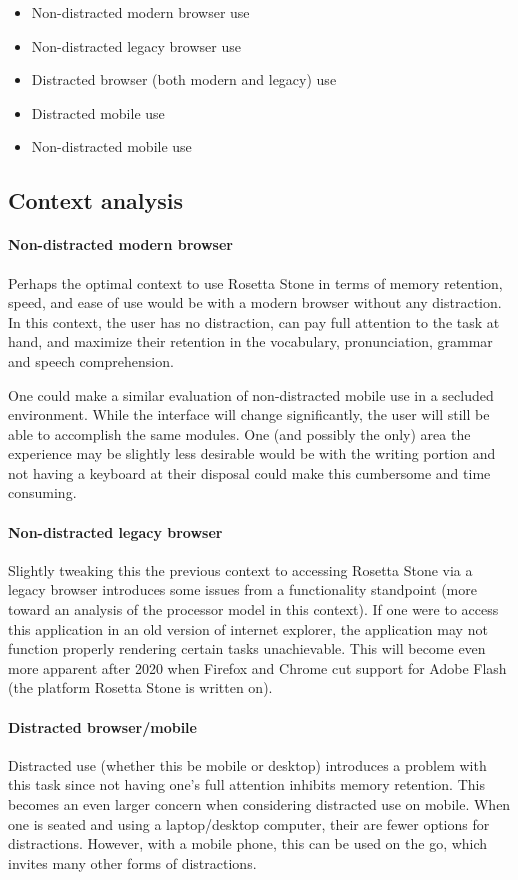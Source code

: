 \begin{itemize}
\item
  Non-distracted modern browser use
\item
  Non-distracted legacy browser use
\item
  Distracted browser (both modern and legacy) use
\item
  Distracted mobile use
\item
  Non-distracted mobile use
\end{itemize}

\subsection{Context analysis}

\paragraph{Non-distracted modern browser}
Perhaps the optimal context to use Rosetta Stone in terms of memory retention, speed, and ease of use would be with a modern browser without any distraction. In this context, the user has no distraction, can pay full attention to the task at hand, and maximize their retention in the vocabulary, pronunciation, grammar and speech comprehension.

One could make a similar evaluation of non-distracted mobile use in a secluded environment. While the interface will change significantly, the user will still be able to accomplish the same modules. One (and possibly the only) area the experience may be slightly less desirable would be with the writing portion and not having a keyboard at their disposal could make this cumbersome and time consuming.

\paragraph{Non-distracted legacy browser}
Slightly tweaking this the previous context to accessing Rosetta Stone via a legacy browser introduces some issues from a functionality standpoint (more toward an analysis of the processor model in this context). If one were to access this application in an old version of internet explorer, the application may not function properly rendering certain tasks unachievable. This will become even more apparent after 2020 when Firefox and Chrome cut support for Adobe Flash (the platform Rosetta Stone is written on).

\paragraph{Distracted browser/mobile}
Distracted use (whether this be mobile or desktop) introduces a problem with this task since not having one's full attention inhibits memory retention. This becomes an even larger concern when considering distracted use on mobile. When one is seated and using a laptop/desktop computer, their are fewer options for distractions. However, with a mobile phone, this can be used on the go, which invites many other forms of distractions.


